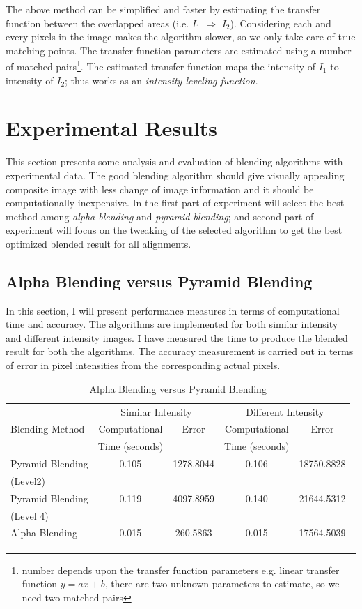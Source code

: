 \noindent The above method can be simplified and faster by estimating the transfer function between the overlapped areas (i.e. $I_1$ $\Rightarrow$ $I_2$). Considering each and every pixels in the image makes the algorithm slower, so we only take care of true matching points. The transfer function parameters are estimated using a number of matched pairs\footnote{number depends upon the transfer function parameters e.g. linear transfer function $y=ax+b$, there are two unknown parameters to estimate, so we need two matched pairs}. The estimated transfer function maps the intensity of $I_1$ to intensity of $I_2$; thus works as an \emph{intensity leveling function}. 

\newpage
\section{Experimental Results}
This section presents some analysis and evaluation of blending algorithms with experimental data. The good blending algorithm should give visually appealing composite image with less change of image information and it should be computationally inexpensive. In the first part of experiment will select the best method among \emph{alpha blending} and \emph{pyramid blending}; and second part of experiment will focus on the tweaking of the selected algorithm to get the best optimized blended result for all alignments. 

\subsection{Alpha Blending versus Pyramid Blending}
In this section, I will present performance measures in terms of computational time and accuracy. The algorithms are implemented for both similar intensity and different intensity images. I have measured the time to produce the blended result for both the algorithms. The accuracy measurement is carried out in terms of error in pixel intensities from the corresponding actual pixels. 


\begin{table}[H]%
\centering
\begin{tabular}{|l|c|c|c|c|}
\hline
\multirow{3}{*}{Blending Method} & \multicolumn{2}{|c|}{Similar Intensity} & \multicolumn{2}{|c|}{Different Intensity}\\ \cline{2-5}
&Computational& Error & Computational& Error\\ 
& Time (seconds) &&Time (seconds)&\\\hline
Pyramid Blending&0.105 & 1278.8044&0.106 &18750.8828 \\ 
(Level2)&&&&\\ \hline
Pyramid Blending&0.119 &4097.8959 &0.140 &21644.5312 \\
(Level 4)&&&&\\ \hline
Alpha Blending & 0.015 & 260.5863&0.015 &17564.5039 \\ \hline
\end{tabular}
\caption{Alpha Blending versus Pyramid Blending}
\label{table:alpha-vs-pyramid}
\end{table}

